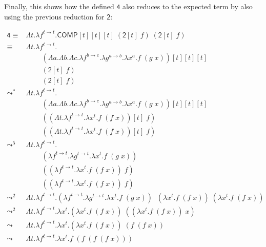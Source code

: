 \documentclass{article}
\begin{document}
Finally, this shows how the defined $\mathsf{4}$ 
also reduces to the expected term by also using the previous 
reduction for $\mathsf{2}$:

\begingroup
\allowdisplaybreaks
\begin{align*}
  \mathsf{4} 
    \equiv&
      \Lambda t.
      \lambda f^{t \rightarrow t}.
        \mathsf{COMP}[t][t][t]\;
        (\mathsf{2}[t]\;f)\;
        (\mathsf{2}[t]\;f) \\
    \equiv&
      \Lambda t.
      \lambda f^{t \rightarrow t}.
        \\&\;\;\;\;\;\;\;\;(\Lambda a. \Lambda b. \Lambda c. 
        \lambda f^{b \rightarrow c}.
        \lambda g^{a \rightarrow b}.
        \lambda x^a.
          f\;(g\;x))[t][t][t]\;
        \\&\;\;\;\;\;\;\;\;(\mathsf{2}[t]\;f)\;
        \\&\;\;\;\;\;\;\;\;(\mathsf{2}[t]\;f) \\
    \leadsto^{*}&
      \Lambda t.
      \lambda f^{t \rightarrow t}.
        \\&\;\;\;\;\;\;\;\;(\Lambda a. \Lambda b. \Lambda c. 
        \lambda f^{b \rightarrow c}.
        \lambda g^{a \rightarrow b}.
        \lambda x^a.
          f\;(g\;x))[t][t][t]\;
        \\&\;\;\;\;\;\;\;\;((
          \Lambda t. \lambda f^{t \rightarrow t}. \lambda 
            x^t. f\;(f\;x))[t]\;f)\;
        \\&\;\;\;\;\;\;\;\;((
          \Lambda t. \lambda f^{t \rightarrow t}. \lambda 
            x^t. f\;(f\;x))[t]\;f) \\
    \leadsto^{5}& 
      \Lambda t.
      \lambda f^{t \rightarrow t}.
        \\&\;\;\;\;\;\;\;\;(
        \lambda f^{t \rightarrow t}.
        \lambda g^{t \rightarrow t}.
        \lambda x^t.
          f\;(g\;x))\;
        \\&\;\;\;\;\;\;\;\;((
          \lambda f^{t \rightarrow t}. \lambda 
            x^t. f\;(f\;x))\;f)\;
        \\&\;\;\;\;\;\;\;\;((
          \lambda f^{t \rightarrow t}. \lambda 
            x^t. f\;(f\;x))\;f) \\
    \leadsto^{2}& 
      \Lambda t.
      \lambda f^{t \rightarrow t}.
        (
        \lambda f^{t \rightarrow t}.
        \lambda g^{t \rightarrow t}.
        \lambda x^t.
          f\;(g\;x))\;
        \;(\lambda x^t. f\;(f\;x))
        \;(\lambda x^t. f\;(f\;x)) \\
    \leadsto^{2}& 
      \Lambda t.
      \lambda f^{t \rightarrow t}.
        \lambda x^t.
        (\lambda x^t. f\;(f\;x))\;
          ((\lambda x^t. f\;(f\;x))\;x)
      \\
    \leadsto& 
      \Lambda t.
      \lambda f^{t \rightarrow t}.
        \lambda x^t.
        (\lambda x^t. f\;(f\;x))\;(f\;(f\;x))
      \\
    \leadsto& 
      \Lambda t.
      \lambda f^{t \rightarrow t}.
        \lambda x^t. f\;(f\;(f\;(f\;x)))
      \\
\end{align*}
\endgroup
\end{document}
